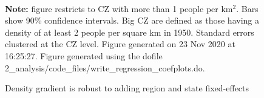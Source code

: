 \begin{figure}[!h]
\centering
\caption{Density gradient is robust to adding region and state fixed-effects}
\label{fig:big_CZ}
  \\ 
\par \begin{minipage}[h]{\textwidth}{\tiny\textbf{Note:} figure restricts to CZ with more than 1 people per km$^2$. Bars show 90\% confidence intervals. Big CZ are defined as those having a density of at least 2 people per square km in 1950. Standard errors clustered at the CZ level. Figure generated on 23 Nov 2020 at 16:25:27. Figure generated using the dofile 2\_analysis/code\_files/write\_regression\_coefplots.do.}\end{minipage}
\end{figure}
